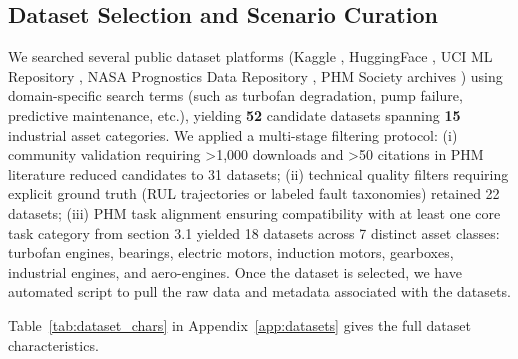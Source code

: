 \documentclass[sigconf, screen, nonacm]{acmart}
\begin{document}
\subsection{Dataset Selection and Scenario Curation} 
We searched several public dataset platforms (Kaggle \cite{kaggle_datasets}, HuggingFace \cite{huggingface_datasets}, UCI ML Repository \cite{UCI_ML_Repo}, NASA Prognostics Data Repository \cite{NASA_Prognostics_Data}, PHM Society archives \cite{PHM_Society_Archives}) using domain-specific search terms (such as turbofan degradation, pump failure, predictive maintenance, etc.), yielding \textbf{52} candidate datasets spanning \textbf{15} industrial asset categories. We applied a multi-stage filtering protocol: (i) community validation requiring >1,000 downloads and >50 citations in PHM literature reduced candidates to 31 datasets; (ii) technical quality filters requiring explicit ground truth (RUL trajectories or labeled fault taxonomies) retained 22 datasets; (iii) PHM task alignment ensuring compatibility with at least one core task category from section 3.1 yielded 18 datasets across 7 distinct asset classes: turbofan engines, bearings, electric motors, induction motors, gearboxes, industrial engines, and aero-engines. Once the dataset is selected, we have automated script to pull the raw data and metadata associated with the datasets. 

Table~\ref{tab:dataset_chars} in Appendix~\ref{app:datasets} gives the full dataset characteristics.

\end{document}
